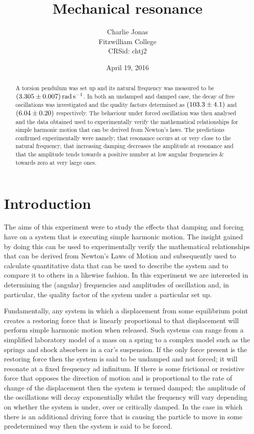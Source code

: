\documentclass[12pt]{article}
\title{Mechanical resonance}
\author{Charlie Jonas\\Fitzwilliam College\\CRSid: chtj2}
\date{April 19, 2016}
\begin{document}
\maketitle

\begin{abstract}
A torsion pendulum was set up and its natural frequency was measured to be $\SI{3.305 \pm 0.007}{\radian\per\second}$. In both an undamped and damped case, the decay of free oscillations was investigated and the quality factors determined as $\SI{103.3 \pm 4.1}{}$ and $\SI{6.04 \pm 0.20}{}$ respectively. The behaviour under forced oscillation was then analysed and the data obtained used to experimentally verify the mathematical relationships for simple harmonic motion that can be derived from Newton's laws. The predictions confirmed experimentally were namely; that resonance occurs at or very close to the natural frequency, that increasing damping decreases the amplitude at resonance and that the amplitude tends towards a positive number at low angular frequencies \& towards zero at very large ones.
\end{abstract}

\section{Introduction}
The aims of this experiment were to study the effects that damping and forcing have on a system that is executing simple harmonic motion. The insight gained by doing this can be used to experimentally verify the mathematical relationships that can be derived from Newton's Laws of Motion and subsequently used to calculate quantitative data that can be used to describe the system and to compare it to others in a likewise fashion. In this experiment we are interested in determining the (angular) frequencies and amplitudes of oscillation and, in particular, the quality factor of the system under a particular set up.

Fundamentally, any system in which a displacement from some equilibrium point creates a restoring force that is linearly proportional to that displacement will perform simple harmonic motion when released. Such systems can range from a simplified laboratory model of a mass on a spring to a complex model such as the springs and shock absorbers in a car's suspension. If the only force present is the restoring force then the system is said to be undamped and not forced; it will resonate at a fixed frequency ad infinitum. If there is some frictional or resistive force that opposes the direction of motion and is proportional to the rate of change of the displacement then the system is termed damped; the amplitude of the oscillations will decay exponentially whilst the frequency will vary depending on whether the system is under, over or critically damped. In the case in which there is an additional driving force that is causing the particle to move in some predetermined way then the system is said to be forced.
\end{document}
